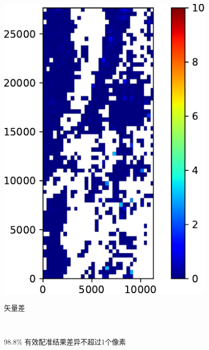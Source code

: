 \documentclass{beamer}
\begin{document}
\begin{frame}
\begin{columns}
\begin{column}{0.39\textwidth}
            \includegraphics[width=0.8\textwidth]{figures/diff-result}\\
            \begin{scriptsize} 矢量差 \end{scriptsize}
        \end{column}
    \end{columns}

    ~\\
    98.8\% 有效配准结果差异不超过1个像素
\end{frame}
\end{document}
